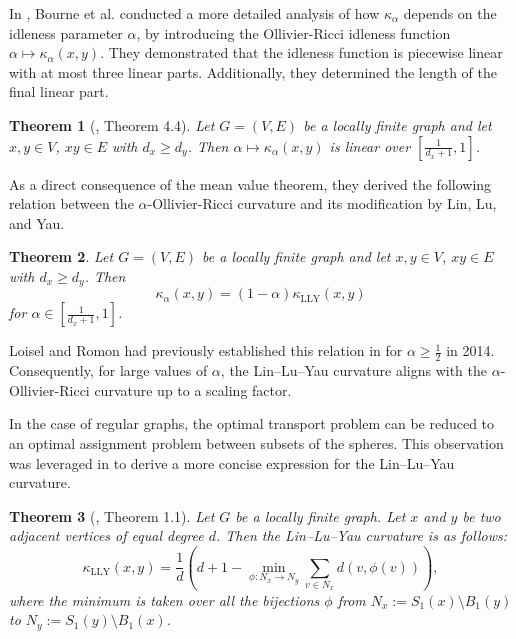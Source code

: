 \documentclass[10pt,a4paper]{article}
\newtheorem{theorem}{Theorem}[section]
\theoremstyle{definition}
\theoremstyle{definition}
\theoremstyle{nonumber}
\begin{document}
In \cite{Bourne}, Bourne et al. conducted a more detailed analysis of how $\kappa_\alpha$ depends on the idleness parameter $\alpha$, by introducing the Ollivier-Ricci idleness function $\alpha \mapsto \kappa_\alpha(x, y)$. They demonstrated that the idleness function is piecewise linear with at most three linear parts. Additionally, they determined the length of the final linear part.

\begin{theorem}[\cite{Bourne}, Theorem 4.4]
Let $G = (V, E)$ be a locally finite graph and let $x, y \in V$, $xy \in E$ with $d_x \geq d_y$. Then $\alpha \mapsto \kappa_\alpha(x, y)$ is linear over $\left[ \frac{1}{d_x+1}, 1 \right]$.
\end{theorem}

As a direct consequence of the mean value theorem, they derived the following relation between the $\alpha$-Ollivier-Ricci curvature and its modification by Lin, Lu, and Yau.

\begin{theorem}\label{relation}
Let $G = (V, E)$ be a locally finite graph and let $x, y \in V$, $xy \in E$ with $d_x \geq d_y$. Then
$$
\kappa_\alpha(x, y) = (1-\alpha)\kappa_{\mathrm{LLY}}(x, y)
$$
for $\alpha \in \left[ \frac{1}{d_x+1}, 1 \right]$.
\end{theorem}

Loisel and Romon had previously established this relation in \cite{Loisel} for $\alpha \geq \frac{1}{2}$ in 2014.
Consequently, for large values of $\alpha$, the Lin--Lu--Yau curvature aligns with the $\alpha$-Ollivier-Ricci curvature up to a scaling factor.

In the case of regular graphs, the optimal transport problem can be reduced to an optimal assignment problem between subsets of the spheres. This observation was leveraged in \cite{Hehl} to derive a more concise expression for the Lin--Lu--Yau curvature.

\begin{theorem}[\cite{Hehl}, Theorem 1.1]\label{equal degree}
Let $G$ be a locally finite graph. Let $x$ and $y$ be two adjacent vertices of equal degree $d$. Then the Lin--Lu--Yau curvature is as follows:
$$
\kappa_{\mathrm{LLY}}(x, y) = \frac{1}{d} \left( d + 1 - \min_{\phi: N_x \to N_y} \sum_{v \in N_x} d(v, \phi(v)) \right),
$$
where the minimum is taken over all the bijections $\phi$ from $N_x := S_1(x) \setminus B_1(y)$ to $N_y := S_1(y) \setminus B_1(x)$.
\end{theorem}
\end{document}
